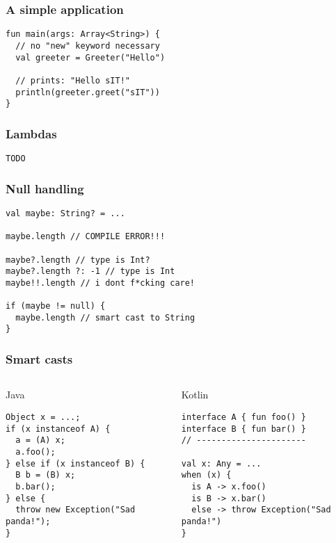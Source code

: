 \begin{frame}[fragile] \frametitle{A simple application}
\begin{lstlisting}
fun main(args: Array<String>) {
  // no "new" keyword necessary
  val greeter = Greeter("Hello")

  // prints: "Hello sIT!"
  println(greeter.greet("sIT"))
}
\end{lstlisting}
\end{frame}

\begin{frame}[fragile] \frametitle{Lambdas}
\begin{lstlisting}
TODO
\end{lstlisting}
\end{frame}

\begin{frame}[fragile] \frametitle{Null handling}
\begin{lstlisting}
val maybe: String? = ...

maybe.length // COMPILE ERROR!!!

maybe?.length // type is Int?
maybe?.length ?: -1 // type is Int
maybe!!.length // i dont f*cking care!

if (maybe != null) {
  maybe.length // smart cast to String
}
\end{lstlisting}
\end{frame}



\begin{frame}[fragile]
\frametitle{Smart casts}
\begin{columns}[t]
\begin{column}{0.5\textwidth}
\begin{center}
  Java
\end{center}
\begin{lstlisting}[style=twosided]
Object x = ...;
if (x instanceof A) {
  a = (A) x;
  a.foo();
} else if (x instanceof B) {
  B b = (B) x;
  b.bar();
} else {
  throw new Exception("Sad panda!");
}
\end{lstlisting}

\end{column}
\begin{column}{0.5\textwidth}
\begin{center}
  Kotlin
\end{center}
\begin{lstlisting}[style=twosided]
interface A { fun foo() }
interface B { fun bar() }
// ----------------------

val x: Any = ...
when (x) {
  is A -> x.foo()
  is B -> x.bar()
  else -> throw Exception("Sad panda!")
}
\end{lstlisting}
\end{column}
\end{columns}
\end{frame}


